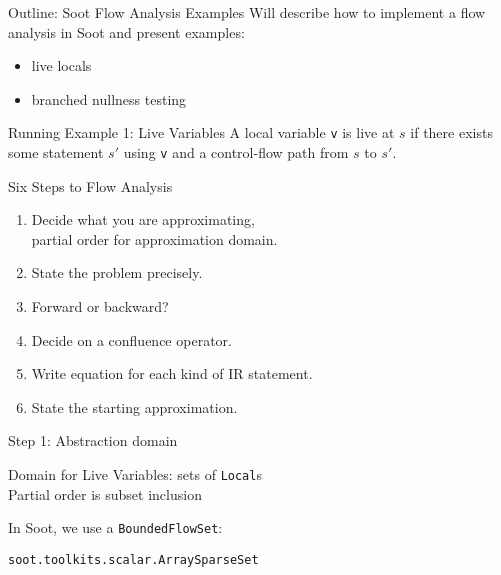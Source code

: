\begin{slide}{Outline: Soot Flow Analysis Examples}
Will describe how to implement a flow analysis in Soot and present examples:
\begin{itemize}
\item live locals
\item branched nullness testing
\end{itemize}
\end{slide}

\begin{slide}{Running Example 1: Live Variables}
\vspace*{-0.2in} 
A local variable {\tt v} is {\red live} at $s$ if there exists some
statement $s'$ using {\tt v} and a control-flow path from $s$ to $s'$.

\quad

\begin{center}

\end{center}
\end{slide}

\begin{slide}{Six Steps to Flow Analysis}
\begin{enumerate}
\item Decide what you are approximating,\\ partial order for approximation domain.

\item State the problem precisely.

\item Forward or backward?

\item Decide on a confluence operator.

\item Write equation for each kind of IR statement.

\item State the starting approximation.
\end{enumerate}
\end{slide}

\begin{slide}{Step 1: Abstraction domain}
\vspace*{-0.2in}

Domain for Live Variables: sets of {\tt Local}s\\
Partial order is subset inclusion

\begin{center}
\scalebox{0.95}{
}
\mbox{\qquad }
\end{center}
\vspace*{-0.1in}

In Soot, we use a {\tt BoundedFlowSet}:
\begin{center}
{\tt soot.toolkits.scalar.ArraySparseSet} 
\end{center}
\end{slide}

